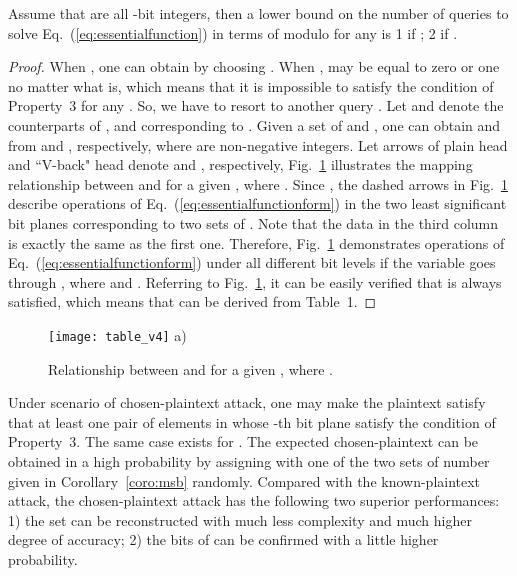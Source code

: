 \documentclass{ws-ijbc}
\newlength\figwidth
\begin{document}
\begin{proposition}
Assume that  are all -bit integers, then a lower bound on the number of queries  to solve
Eq.~(\ref{eq:essentialfunction}) in terms of modulo  for any  is 1 if ; 2 if .
\end{proposition}
\begin{proof}
When , one can obtain  by choosing  .
When ,  may be equal to zero or one no matter what  is, which means that
it is impossible to satisfy the condition of Property~3 for any . So, we have to resort to another
query . Let  and  denote the counterparts of , and 
corresponding to . Given a set of  and , one can obtain
 and  from  and , respectively,
where  are non-negative integers. Let arrows of plain head and ``V-back" head denote  and , respectively,
Fig.~\ref{fig:relationship} illustrates the mapping relationship between  and 
for a given , where . Since ,
the dashed arrows in Fig.~\ref{fig:relationship} describe operations of Eq.~(\ref{eq:essentialfunctionform}) in the two least significant bit planes corresponding to two sets of . Note that the data in the third column is exactly the same as the first one. Therefore, Fig.~\ref{fig:relationship} demonstrates operations of Eq.~(\ref{eq:essentialfunctionform})
under all different bit levels if the variable  goes through , where  and . Referring to Fig.~\ref{fig:relationship}, it can be
easily verified that  is always satisfied, which means that  can be derived from Table~1.
\end{proof}
\begin{figure}[!htb]
\centering
\begin{minipage}{1.5\figwidth}
\centering
\texttt{[image: table\_v4]}
a)
\end{minipage}
\caption{Relationship between   and   for
a given  , where .}
\label{fig:relationship}
\end{figure}

Under scenario of chosen-plaintext attack, one may make the plaintext satisfy that at least one pair of elements in  whose -th bit plane satisfy the condition of Property~3. The same case exists for . The expected chosen-plaintext can be
obtained in a high probability by assigning  with one of the two sets of number given in Corollary~\ref{coro:msb} randomly. Compared with
the known-plaintext attack, the chosen-plaintext attack has the following two superior performances:
1) the set  can be reconstructed with much less complexity and much higher degree of accuracy;
2) the bits of  can be confirmed with a little higher probability.
\end{document}
